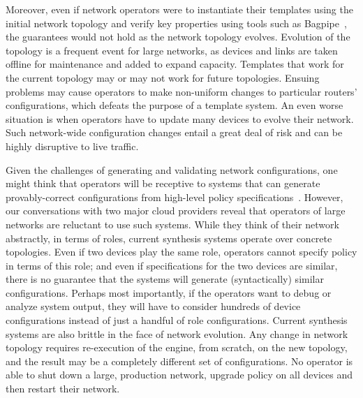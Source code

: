 \documentclass[numbers, 10pt, preprint]{sigplanconf}
\begin{document}
Moreover, even if network operators were to instantiate their templates using the initial network 
topology and verify key properties using tools such as Bagpipe~\cite{bagpipe}, the guarantees
would not hold as the network topology evolves. Evolution of the topology is a frequent event for large networks, as  devices and links are taken offline for maintenance and  added to expand
capacity.  
Templates that
work for the current topology may or may not work for future
topologies. Ensuing problems may cause operators to make non-uniform changes to particular routers' configurations,
which defeats the purpose of a template system.  An even worse situation is when
operators have to update many devices to evolve their network.  
Such network-wide configuration changes entail a great deal of risk and can be highly
disruptive to live traffic.


Given the challenges of generating and validating network configurations, one
might think that operators will be receptive to systems that can generate
provably-correct configurations from high-level policy
specifications~\cite{narain+:configassure,propane,synet-synthesis}. However, our conversations
with two major cloud providers reveal that operators of large networks are
reluctant to use such systems. While they think of their network abstractly, in
terms of roles, current synthesis systems operate over concrete topologies.  
Even if two devices play the same role, operators cannot specify policy in terms of
this role; and even if specifications for the two devices are similar,
there is no guarantee that the systems will generate (syntactically) similar
configurations.  Perhaps most importantly, if the operators want to debug or analyze system output, they
will have to consider hundreds of device configurations instead of just a handful of
role configurations. Current synthesis systems are also brittle in the face of network
evolution. Any change in network topology requires re-execution of the engine,
from scratch, on the new topology, and the result may be a completely different
set of configurations.  No operator is
able to shut down a large, production network, upgrade policy on all devices and 
then restart their network.
\end{document}
